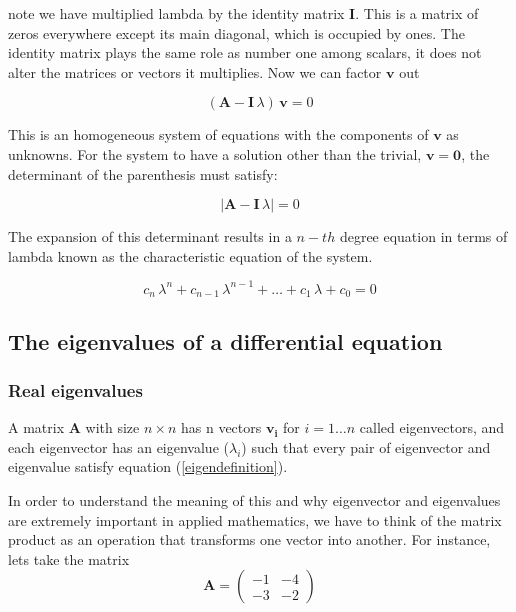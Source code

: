 \documentclass[12pt]{article}
\begin{document}
note we have multiplied lambda by the identity matrix $\mathbf{I}$. This is a matrix of zeros everywhere except its main diagonal, which is occupied by ones. The identity matrix plays the same role as number one among scalars, it does not alter the matrices or vectors it multiplies. Now we can factor $\mathbf{v}$ out 

\begin{equation}
	\label{solve4eigenvec}
	\left( \mathbf{A}   - \mathbf{I} \, \lambda     \right) \, \mathbf{v} =  0  
\end{equation}

This is an homogeneous system of equations with the components of $\mathbf{v}$ as unknowns. For the system to have a solution other than the trivial, $\mathbf{v}=\mathbf{0}$, the determinant of the parenthesis must satisfy:

\begin{equation}
	\label{solve4eigenval}
	\left| \mathbf{A}   - \mathbf{I} \, \lambda     \right|  =  0  
\end{equation}

The expansion of this determinant results in a $n-th$ degree equation in terms of lambda known as the characteristic equation of the system.

\begin{equation}
c_n \, \lambda^n +c_{n-1} \, \lambda^{n-1}  + \dots  + c_1 \, \lambda + c_0 = 0 \nonumber
\end{equation}

\subsection{The eigenvalues of a differential equation} 

\subsubsection{Real eigenvalues}
A matrix $\mathbf{A}$ with size $n \times n$ has n vectors $\mathbf{v_i}$ for $i = 1 \dots n$ called eigenvectors, and each eigenvector has an eigenvalue ($\lambda_i$) such that every pair of eigenvector and eigenvalue satisfy equation (\ref{eigendefinition}).
	
In order to understand the meaning of this and why eigenvector and eigenvalues are extremely important in applied mathematics, we have to think of the matrix product as an operation that transforms one vector into another. For instance, lets take the matrix
\begin{equation}
	\mathbf{A}  = \begin{pmatrix} -1 & -4\\ -3 & -2\end{pmatrix} \nonumber
\end{equation}
\end{document}
